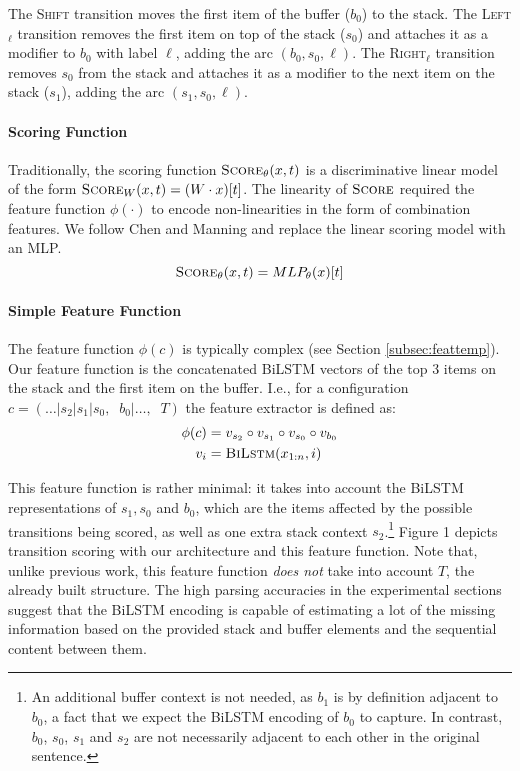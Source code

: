 \documentclass[11pt]{article}
\begin{document}
\noindent The \textsc{Shift} transition moves the first item of the buffer ($b_0$) to the stack.
The \textsc{Left}$_\ell$ transition removes the first item on top of the stack
($s_0$) and attaches it as a modifier to $b_0$ with label $\ell$, adding the arc $(b_0,s_0,\ell)$.
The \textsc{Right}$_\ell$ transition removes $s_0$ from the stack and attaches
it as a modifier to the next item on the stack ($s_1$), adding the arc
$(s_1,s_0,\ell)$.

\paragraph{Scoring Function}
Traditionally, the scoring function $\textsc{Score}_\mathbf{\theta}(x,t)$ is a
discriminative linear model of the form $\textsc{Score}_W(x,t) =
(W\cdot x)[t]$.
The linearity of $\textsc{Score}$ required the feature function $\phi(\cdot)$ to encode
non-linearities in the form of combination features.  We
follow Chen and Manning  and replace the linear scoring
model with an MLP.
\[
\textsc{Score}_\mathbf{\theta}(x,t) = MLP_\mathbf{\theta}(x)[t]
\]

\paragraph{Simple Feature Function}
The feature function $\phi(c)$ is typically complex (see Section \ref{subsec:feattemp}).
Our feature function is the concatenated \mbox{BiLSTM} vectors of the top 3 items on the
stack and the first item on the buffer.
I.e., for a configuration $c = (\dots | s_2 | s_1 | s_0,\;\; b_0 | \dots,\;\; T)$
the feature extractor is defined as:
\begin{align*}
    \phi(c) &= v_{s_2}\circ v_{s_1} \circ v_{s_0} \circ v_{b_0} \\
    v_i &= \textsc{BiLstm}(x_{1:n}, i) 
\end{align*}

This feature function is rather minimal: it takes into account the BiLSTM
representations of $s_1, s_0$ and
$b_0$, which are the items affected by the possible transitions being scored, as
well as one extra
stack context $s_2$.\footnote{An additional buffer context is not needed, as
$b_1$ is by definition adjacent to $b_0$, a fact that we expect the BiLSTM
encoding of $b_0$ to capture.  In contrast, $b_0$, $s_0$, $s_1$ and $s_2$ are
not necessarily adjacent to each other in the original sentence.}
Figure 1 depicts transition scoring with our architecture and this feature function. Note that, unlike previous work, this feature function \emph{does not} take into account $T$, the already built
structure.  The high parsing accuracies in the experimental sections suggest
that the \mbox{BiLSTM} encoding is capable of estimating a lot of the missing
information based on the provided stack and buffer elements and the sequential
content between them.
\end{document}
